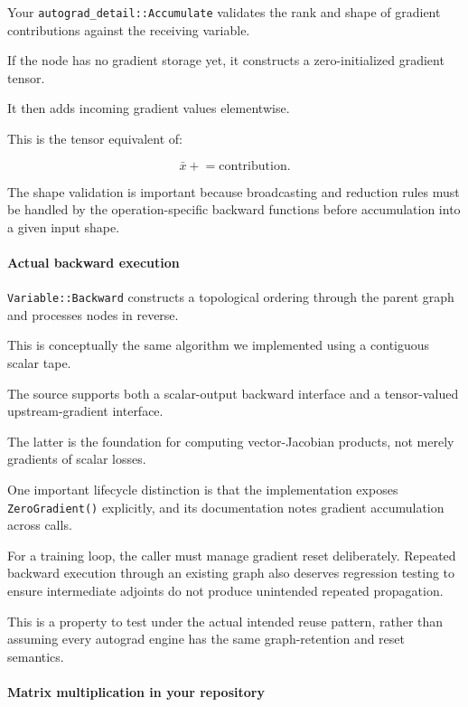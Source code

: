 Your \texttt{autograd\_detail::Accumulate} validates the rank and shape of gradient contributions against the receiving variable.

If the node has no gradient storage yet, it constructs a zero-initialized gradient tensor.

It then adds incoming gradient values elementwise.

This is the tensor equivalent of:

\[
\bar x\mathrel{+}=\text{contribution}.
\]

The shape validation is important because broadcasting and reduction rules must be handled by the operation-specific backward functions before accumulation into a given input shape.

\paragraph{Actual backward execution}\label{02-foundations-ii-ch022-actual-backward-execution}

\texttt{Variable::Backward} constructs a topological ordering through the parent graph and processes nodes in reverse.

This is conceptually the same algorithm we implemented using a contiguous scalar tape.

The source supports both a scalar-output backward interface and a tensor-valued upstream-gradient interface.

The latter is the foundation for computing vector-Jacobian products, not merely gradients of scalar losses.

One important lifecycle distinction is that the implementation exposes \texttt{ZeroGradient()} explicitly, and its documentation notes gradient accumulation across calls.

For a training loop, the caller must manage gradient reset deliberately. Repeated backward execution through an existing graph also deserves regression testing to ensure intermediate adjoints do not produce unintended repeated propagation.

This is a property to test under the actual intended reuse pattern, rather than assuming every autograd engine has the same graph-retention and reset semantics.

\paragraph{Matrix multiplication in your repository}\label{02-foundations-ii-ch022-matrix-multiplication-in-your-repository}

